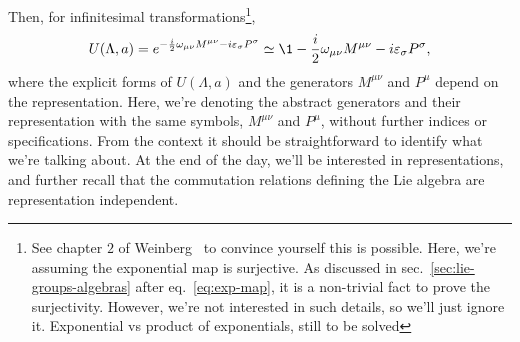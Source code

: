 Then, for infinitesimal transformations\footnote{See chapter $2$ of Weinberg~\cite{weinberg} to convince yourself this is possible. Here, we're assuming the exponential map is surjective. As discussed in sec.~\ref{sec:lie-groups-algebras} after eq.~\eqref{eq:exp-map}, it is a non-trivial fact to prove the surjectivity. However, we're not interested in such details, so we'll just ignore it. \color{red} Exponential vs product of exponentials, still to be solved \color{black}},
\begin{equation}\label{eq:infinitesimal-poicare-transformation}
    U(\Lambda, a) = e^{-\frac{i}{2} \omega_{\mu\nu} M^{\mu\nu} - i \epsilon_\sigma P^\sigma} \simeq \1 - \frac{i}{2} \omega_{\mu\nu} M^{\mu\nu} - i \epsilon_\sigma P^\sigma,
\end{equation}
where the explicit forms of $U(\Lambda,a)$ and the generators $M^{\mu\nu}$ and $P^\mu$ depend on the representation. Here, we're denoting the abstract generators and their representation with the same symbols, $M^{\mu\nu}$ and $P^\mu$, without further indices or specifications. From the context it should be straightforward to identify what we're talking about. At the end of the day, we'll be interested in representations, and further recall that the commutation relations defining the Lie algebra are representation independent.

